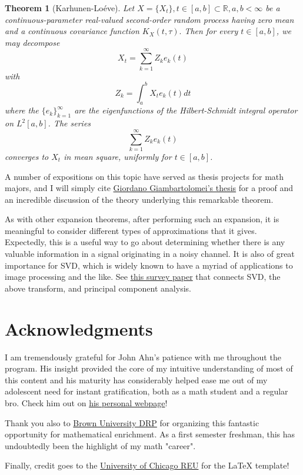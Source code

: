 \documentclass[psamsfonts]{amsart}
\newtheorem{thm}{Theorem}[section]
\theoremstyle{definition}
\theoremstyle{remark}
\numberwithin{equation}{section}
\begin{document}
\begin{thm}[Karhunen-Lo\'{e}ve]
Let $X = \{ X_t \}, t \in [a, b] \subset \mathbb{R}, a, b < \infty$ be a continuous-parameter real-valued second-order random process having zero mean and a continuous covariance function $K_X(t, \tau).$ Then for every $t \in[a,b]$, we may decompose 
$$X_t = \sum ^\infty _{k = 1} Z_k e_k (t) $$
with 
$$Z_k = \int _a ^b X_t e_k (t) dt $$
where the $\{e_k \} ^\infty _{k=1}$ are the eigenfunctions of the Hilbert-Schmidt integral operator on $L^2[a,b]$. The series 
$$\sum _{k=1}^\infty Z_k e_k(t) $$
converges to $X_t$ in mean square, uniformly for $t \in [a,b]$.
\end{thm}

A number of expositions on this topic have served as thesis projects for math majors, and I will simply cite \href{https://core.ac.uk/download/pdf/31159449.pdf}{Giordano Giambartolomei's thesis} for a proof and an incredible discussion of the theory underlying this remarkable theorem. 

As with other expansion theorems, after performing such an expansion, it is meaningful to consider different types of approximations that it gives. Expectedly, this is a useful way to go about determining whether there is any valuable information in a signal originating in a noisy channel. It is also of great importance for SVD, which is widely known to have a myriad of applications to image processing and the like. See \href{http://fourier.eng.hmc.edu/book/lectures/KLTnSVD.pdf}{this survey paper} that connects SVD, the above transform, and principal component analysis. 

\section{Acknowledgments}  I am tremendously grateful for John Ahn's patience with me throughout the program. His insight provided the core of my intuitive understanding of most of this content and his maturity has considerably helped ease me out of my adolescent need for instant gratification, both as a math student and a regular bro. Check him out on \href{https://jtahn.github.io/about/}{his personal webpage}! 

Thank you also to \href{https://www.math.brown.edu/drp/}{Brown University DRP} for organizing this fantastic opportunity for mathematical enrichment. As a first semester freshman, this has undoubtedly been the highlight of my math "career". 

Finally, credit goes to the \href{https://math.uchicago.edu/~may/REU2021/}{University of Chicago REU} for the \LaTeX $ $ template!
\end{document}
